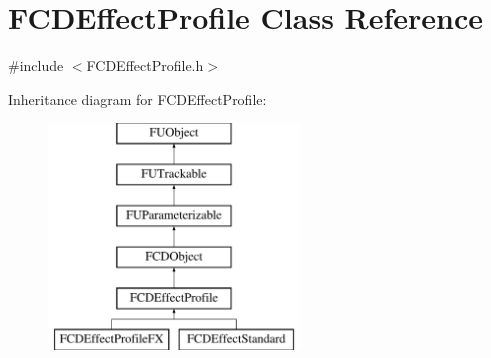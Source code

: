 \hypertarget{classFCDEffectProfile}{
\section{FCDEffectProfile Class Reference}
\label{classFCDEffectProfile}
}


{\ttfamily \#include $<$FCDEffectProfile.h$>$}

Inheritance diagram for FCDEffectProfile:\begin{figure}[H]
\begin{center}
\leavevmode
\includegraphics[height=6.000000cm]{classFCDEffectProfile}
\end{center}
\end{figure}
